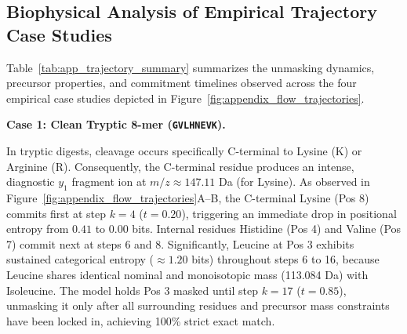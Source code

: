 \subsection{Biophysical Analysis of Empirical Trajectory Case Studies}

Table~\ref{tab:app_trajectory_summary} summarizes the unmasking dynamics, precursor properties, and commitment timelines observed across the four empirical case studies depicted in Figure~\ref{fig:appendix_flow_trajectories}.

\begin{table}[!ht]
\centering
\small
\setlength{\tabcolsep}{5pt}
\caption{Empirical unmasking sequence and milestone steps for the four test benchmark peptides under the 20-step cosine schedule.}
\label{tab:app_trajectory_summary}
\end{table}

\noindent\textbf{Case 1: Clean Tryptic 8-mer (\texttt{GVLHNEVK}).}\par\vspace{2pt}
In tryptic digests, cleavage occurs specifically C-terminal to Lysine (K) or Arginine (R). Consequently, the C-terminal residue produces an intense, diagnostic $y_1$ fragment ion at $m/z \approx 147.11$ Da (for Lysine). As observed in Figure~\ref{fig:appendix_flow_trajectories}A--B, the C-terminal Lysine (Pos 8) commits first at step $k=4$ ($t=0.20$), triggering an immediate drop in positional entropy from $0.41$ to $0.00$ bits. Internal residues Histidine (Pos 4) and Valine (Pos 7) commit next at steps 6 and 8. Significantly, Leucine at Pos 3 exhibits sustained categorical entropy ($\approx 1.20$ bits) throughout steps 6 to 16, because Leucine shares identical nominal and monoisotopic mass (113.084 Da) with Isoleucine. The model holds Pos 3 masked until step $k=17$ ($t=0.85$), unmasking it only after all surrounding residues and precursor mass constraints have been locked in, achieving 100\% strict exact match.


